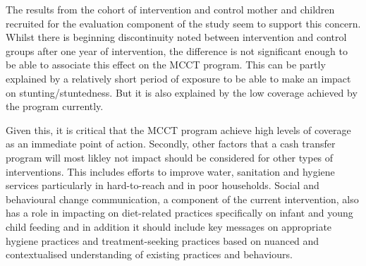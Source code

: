 \documentclass[12pt,a4paper]{article}
\begin{document}
The results from the cohort of intervention and control mother and children recruited for the evaluation component of the study seem to support this concern. Whilst there is beginning discontinuity noted between intervention and control groups after one year of intervention, the difference is not significant enough to be able to associate this effect on the MCCT program. This can be partly explained by a relatively short period of exposure to be able to make an impact on stunting/stuntedness. But it is also explained by the low coverage achieved by the program currently.

Given this, it is critical that the MCCT program achieve high levels of coverage as an immediate point of action. Secondly, other factors that a cash transfer program will most likley not impact should be considered for other types of interventions. This includes efforts to improve water, sanitation and hygiene services particularly in hard-to-reach and in poor households. Social and behavioural change communication, a component of the current intervention, also has a role in impacting on diet-related practices specifically on infant and young child feeding and in addition it should include key messages on appropriate hygiene practices and treatment-seeking practices based on nuanced and contextualised understanding of existing practices and behaviours.

\renewcommand\refname{References}

\end{document}
